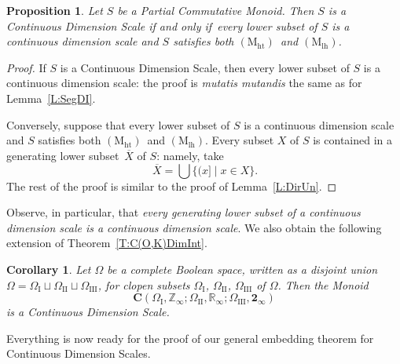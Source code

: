 \documentclass[psamsfonts,reqno]{memo-l}
\theoremstyle{plain}
\newtheorem{proposition}[lemma]{Proposition}
\newtheorem{corollary}[lemma]{Corollary}
\theoremstyle{definition}
\theoremstyle{remark}
\numberwithin{equation}{section}
\newcommand{\Mh}{$(\mathrm{M_{ht}})$}
\newcommand{\Ml}{$(\mathrm{M_{lh}})$}
\newcommand{\two}{\mathbf{2}}
\newcommand{\Cn}{\mathbf{2}_{\infty}}
\newcommand{\Zn}{\mathbb{Z}_{\infty}}
\newcommand{\Rn}{\mathbb{R}_{\infty}}
\renewcommand{\iff}{if and only if}
\newcommand{\ol}[1]{\,\overline{\!#1}}
\newcommand{\CC}{\mathbf{C}}
\newcommand{\I}{\mathrm{I}}
\newcommand{\II}{\mathrm{II}}
\newcommand{\III}{\mathrm{III}}
\newcommand{\ZZ}{\mathbb{Z}}
\newcommand{\RR}{\mathbb{R}}
\newcommand{\PCM}{Partial Commutative Mon\-oid}
\newcommand{\set}[1]{\{#1\}}
\newcommand{\setm}[2]{\set{#1\mid#2}}
\begin{document}
\begin{proposition}\label{P:DimIntClass}
Let $S$ be a \PCM. Then $S$ is a Continuous Dimension Scale
\iff\ every lower subset
of $S$ is a continuous dimension scale
 and $S$ satisfies both \Mh\ and \Ml.
\end{proposition}

\begin{proof}
If $S$ is a Continuous Dimension Scale,
 then every lower subset of $S$ is a continuous dimension scale: the proof is \emph{mutatis mutandis} the
same as for Lemma~\ref{L:SegDI}.

Conversely, suppose that every lower subset of $S$ is a continuous dimension scale
 and
$S$ satisfies both \Mh\ and \Ml. Every subset $X$ of $S$ is contained in a
generating lower subset $\ol{X}$ of $S$: namely, take
   \[
   \ol{X}=\bigcup\setm{(x]}{x\in X}.
   \]
The rest of the proof is similar to the proof of Lemma~\ref{L:DirUn}.
\end{proof}

Observe, in particular, that \emph{every generating lower subset of a
continuous dimension scale is a continuous dimension scale}. We
also obtain the following extension of Theorem~\ref{T:C(O,K)DimInt}.

\begin{corollary}\label{C:DimIntClass}
Let $\Omega$ be a complete Boolean space, written as a
disjoint union $\Omega=\Omega_{\I}\sqcup\Omega_{\II}\sqcup\Omega_{\III}$, for
clopen subsets $\Omega_{\I}$, $\Omega_{\II}$, $\Omega_{\III}$ of $\Omega$.
Then the Monoid
\index{Zzzinfty@$\ZZ_\infty$}\index{Rzzinfty@$\RR_\infty$}%
\index{Tzzinfty@$\two_\infty$}%
   \[
\CC(\Omega_{\I},\Zn;\Omega_{\II},\Rn;\Omega_{\III},\Cn)
   \]
is a Continuous Dimension Scale.
\end{corollary}

Everything is now ready for the proof of our general embedding theorem
for Continuous Dimension Scales.
\end{document}
